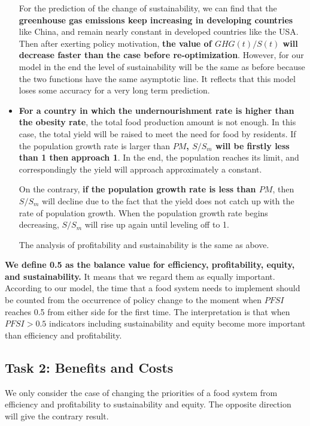 \documentclass[12pt]{article}
\begin{document}
\begin{itemize}
    For the prediction of the change of sustainability, we can find that the \textbf{greenhouse gas emissions keep increasing in developing countries} like China, and remain nearly constant in developed countries like the USA. Then after exerting policy motivation, \textbf{the value of $GHG(t)/S(t)$ will decrease faster than the case before re-optimization}. However, for our model in the end the level of sustainability will be the same as before because the two functions have the same asymptotic line. It reflects that this model loses some accuracy for a very long term prediction.
    
    
    \item \textbf{For a country in which the undernourishment rate is higher than the obesity rate}, the total food production amount is not enough. In this case, the total yield will be raised to meet the need for food by residents. If the population growth rate is larger than \textbf{$PM$, $S/S_m$ will be firstly less than 1 then approach 1}. In the end, the population reaches its limit, and correspondingly the yield will approach approximately a constant.
    
    On the contrary, \textbf{if the population growth rate is less than $PM$}, then $S/S_m$ will decline due to the fact that the yield does not catch up with the rate of population growth. When the population growth rate begins decreasing, $S/S_m$ will rise up again until leveling off to 1.
    
    The analysis of profitability and sustainability is the same as above.
    
\end{itemize}


\textbf{We define 0.5 as the balance value for efficiency, profitability, equity, and sustainability.} It means that we regard them as equally important. According to our model, the time that a food system needs to implement should be counted from the occurrence of policy change to the moment when $PFSI$ reaches 0.5 from either side for the first time. The interpretation is that when $PFSI > 0.5$ indicators including sustainability and equity become more important than efficiency and profitability. 

\subsection{Task 2: Benefits and Costs}

We only consider the case of changing the priorities of a food system from efficiency and profitability to sustainability and equity. The opposite direction will give the contrary result. 
\end{document}
